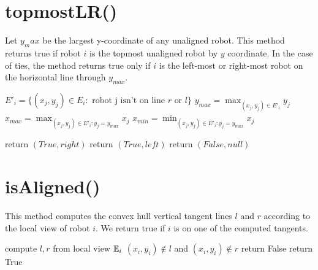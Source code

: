\documentclass[preprint,10pt]{elsarticle}
\begin{document}
\appendix
\section{topmostLR()} 

Let $y_max$ be the largest y-coordinate of any unaligned robot. 
This method returns true if robot $i$ is the topmost unaligned robot by $y$ coordinate. In the
case of ties, the method returns true only if $i$ is the left-most or right-most 
robot on the horizontal line through $y_{max}$.

\begin{algorithm}
\begin{algorithmic}
	\State $E'_i = \{ (x_j, y_j) \in E_i : \text{ robot j isn't on line } r \text{ or } l\}$
	\State $y_{max} = \max_{(x_j, y_j) \in E'_i}{y_j}$ 
	\State $x_{max} = \max_{(x_j, y_j) \in E'_i : y_j = y_{max} }{x_j}$ 
	\State $x_{min} = \min_{(x_j, y_j) \in E'_i : y_j = y_{max} }{x_j}$ 

		\State return $(True, right)$
		\State return $(True, left)$
	\Else
		\State return $(False, null)$
	\EndIf

\EndProcedure
\end{algorithmic}
\end{algorithm}

\section{isAligned()} 

This method computes the convex hull vertical tangent lines $l$ and $r$ according
to the local view of robot $i$. We return true if $i$ is on one of the 
computed tangents.
\begin{algorithm}
\begin{algorithmic}[1]
	\State compute $l,r$ from local view $\mathbb{E}_i$
	\If $(x_i, y_i) \notin  l$ and $(x_i, y_i) \notin r$
		\State return False
	\Else 
		\State return True
	\EndIf
\EndProcedure
\end{algorithmic}
\end{algorithm}
\end{document}
